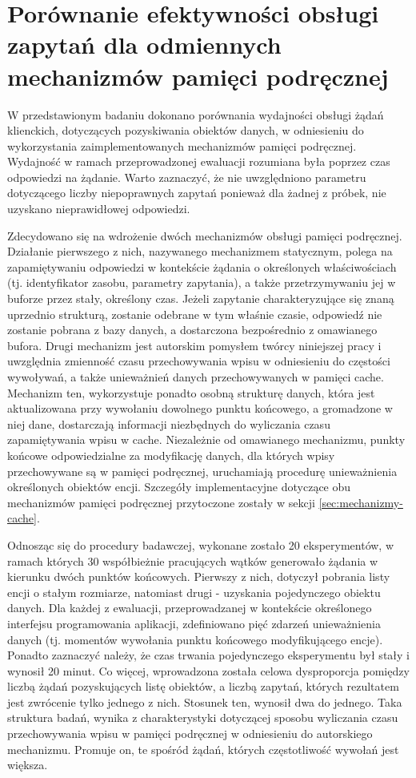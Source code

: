 \section{Porównanie efektywności obsługi zapytań dla odmiennych mechanizmów pamięci podręcznej}
W przedstawionym badaniu dokonano porównania wydajności obsługi żądań klienckich, dotyczących pozyskiwania obiektów danych, w odniesieniu do wykorzystania zaimplementowanych mechanizmów pamięci podręcznej. Wydajność w ramach przeprowadzonej ewaluacji rozumiana była poprzez czas odpowiedzi na żądanie. Warto zaznaczyć, że nie uwzględniono parametru dotyczącego liczby niepoprawnych zapytań ponieważ dla żadnej z próbek, nie uzyskano nieprawidłowej odpowiedzi.

Zdecydowano się na wdrożenie dwóch mechanizmów obsługi pamięci podręcznej. Działanie pierwszego z nich, nazywanego mechanizmem statycznym, polega na zapamiętywaniu odpowiedzi w kontekście żądania o określonych właściwościach (tj. identyfikator zasobu, parametry zapytania), a także przetrzymywaniu jej w buforze przez stały, określony czas. Jeżeli zapytanie charakteryzujące się znaną uprzednio strukturą, zostanie odebrane w tym właśnie czasie, odpowiedź nie zostanie pobrana z bazy danych, a dostarczona bezpośrednio z omawianego bufora. Drugi mechanizm jest autorskim pomysłem twórcy niniejszej pracy i uwzględnia zmienność czasu przechowywania wpisu w odniesieniu do częstości wywoływań, a także unieważnień danych przechowywanych w pamięci cache. Mechanizm ten, wykorzystuje ponadto osobną strukturę danych, która jest aktualizowana przy wywołaniu dowolnego punktu końcowego, a gromadzone w niej dane, dostarczają informacji niezbędnych do wyliczania czasu zapamiętywania wpisu w cache. Niezależnie od omawianego mechanizmu, punkty końcowe odpowiedzialne za modyfikację danych, dla których wpisy przechowywane są w pamięci podręcznej, uruchamiają procedurę unieważnienia określonych obiektów encji. Szczegóły implementacyjne dotyczące obu mechanizmów pamięci podręcznej przytoczone zostały w sekcji \ref{sec:mechanizmy-cache}.

Odnosząc się do procedury badawczej, wykonane zostało 20 eksperymentów, w ramach których 30 współbieżnie pracujących wątków generowało żądania w kierunku dwóch punktów końcowych. Pierwszy z nich, dotyczył pobrania listy encji o stałym rozmiarze, natomiast drugi - uzyskania pojedynczego obiektu danych. Dla każdej z ewaluacji, przeprowadzanej w kontekście określonego interfejsu programowania aplikacji, zdefiniowano pięć zdarzeń unieważnienia danych (tj. momentów wywołania punktu końcowego modyfikującego encje). Ponadto zaznaczyć należy, że czas trwania pojedynczego eksperymentu był stały i wynosił 20 minut. Co więcej, wprowadzona została celowa dysproporcja pomiędzy liczbą żądań pozyskujących listę obiektów, a liczbą zapytań, których rezultatem jest zwrócenie tylko jednego z nich. Stosunek ten, wynosił dwa do jednego. Taka struktura badań, wynika z charakterystyki dotyczącej sposobu wyliczania czasu przechowywania wpisu w pamięci podręcznej w odniesieniu do autorskiego mechanizmu. Promuje on, te spośród żądań, których częstotliwość wywołań jest większa.

